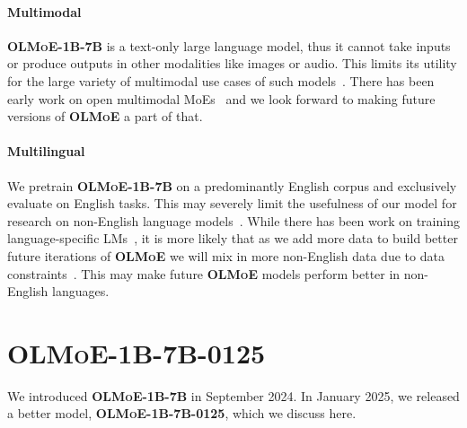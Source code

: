 \documentclass{article}
\newcommand{\model}{\textbf{\textsc{OLMoE}}}
\newcommand{\modelsmall}{\textbf{\textsc{OLMoE-1B-7B}}}
\newcommand{\modelsmallnew}{\textbf{\textsc{OLMoE-1B-7B-0125}}}
\begin{document}
\paragraph{Multimodal} \modelsmall{} is a text-only large language model, thus it cannot take inputs or produce outputs in other modalities like images or audio. This limits its utility for the large variety of multimodal use cases of such models~\citep{huang2018musictransformer,su2020vlbertpretraininggenericvisuallinguistic,chen2020generative,kiela2021hateful,muennighoff2020vilio,radford2022robustspeechrecognitionlargescale,bai2023qwenvlversatilevisionlanguagemodel,driess2023palmeembodiedmultimodallanguage,dubey2024llama3herdmodels}. There has been early work on open multimodal MoEs~\citep{mustafa2022multimodalcontrastivelearninglimoe,lin2024moellavamixtureexpertslarge,li2024unimoescalingunifiedmultimodal,shen2023scalingvisionlanguagemodelssparse,mckinzie2024mm1methodsanalysis,wu2024omnismolaboostinggeneralistmultimodal} and we look forward to making future versions of \model{} a part of that.

\paragraph{Multilingual} We pretrain \modelsmall{} on a predominantly English corpus and exclusively evaluate on English tasks. This may severely limit the usefulness of our model for research on non-English language models~\citep{lovenia2024seacrowdmultilingualmultimodaldata,singh2024aya,üstün2024aya,enevoldsen2024scandinavianembeddingbenchmarkscomprehensive,son2024kmmlumeasuringmassivemultitask,xiao2023cpack}. While there has been work on training language-specific LMs~\citep{luukkonen2023fingpt,faysse2024croissantllmtrulybilingualfrenchenglish}, it is more likely that as we add more data to build better future iterations of \model{} we will mix in more non-English data due to data constraints~\citep{muennighoff2023scaling}. This may make future \model{} models perform better in non-English languages.

\section{\modelsmallnew{}}
\label{sec:olmoe0125}

We introduced \modelsmall{} in September 2024. In January 2025, we released a better model, \modelsmallnew{}, which we discuss here.
\end{document}
